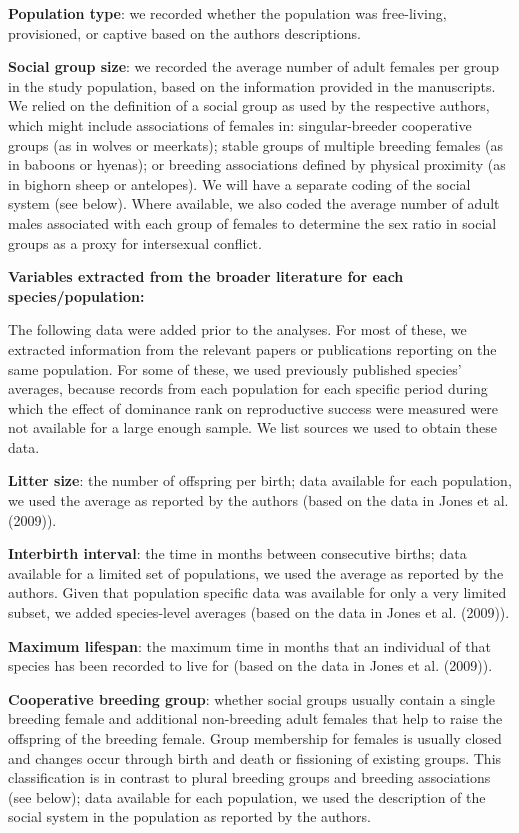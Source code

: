 \documentclass[
]{article}
\begin{document}
\textbf{Population type}: we recorded whether the population was
free-living, provisioned, or captive based on the authors descriptions.

\textbf{Social group size}: we recorded the average number of adult
females per group in the study population, based on the information
provided in the manuscripts. We relied on the definition of a social
group as used by the respective authors, which might include
associations of females in: singular-breeder cooperative groups (as in
wolves or meerkats); stable groups of multiple breeding females (as in
baboons or hyenas); or breeding associations defined by physical
proximity (as in bighorn sheep or antelopes). We will have a separate
coding of the social system (see below). Where available, we also coded
the average number of adult males associated with each group of females
to determine the sex ratio in social groups as a proxy for intersexual
conflict.

\textbf{Variables extracted from the broader literature for each
species/population:}

The following data were added prior to the analyses. For most of these,
we extracted information from the relevant papers or publications
reporting on the same population. For some of these, we used previously
published species' averages, because records from each population for
each specific period during which the effect of dominance rank on
reproductive success were measured were not available for a large enough
sample. We list sources we used to obtain these data.

\textbf{Litter size}: the number of offspring per birth; data available
for each population, we used the average as reported by the authors
(based on the data in Jones et al. (2009)).

\textbf{Interbirth interval}: the time in months between consecutive
births; data available for a limited set of populations, we used the
average as reported by the authors. Given that population specific data
was available for only a very limited subset, we added species-level
averages (based on the data in Jones et al. (2009)).

\textbf{Maximum lifespan}: the maximum time in months that an individual
of that species has been recorded to live for (based on the data in
Jones et al. (2009)).

\textbf{Cooperative breeding group}: whether social groups usually
contain a single breeding female and additional non-breeding adult
females that help to raise the offspring of the breeding female. Group
membership for females is usually closed and changes occur through birth
and death or fissioning of existing groups. This classification is in
contrast to plural breeding groups and breeding associations (see
below); data available for each population, we used the description of
the social system in the population as reported by the authors.
\end{document}
